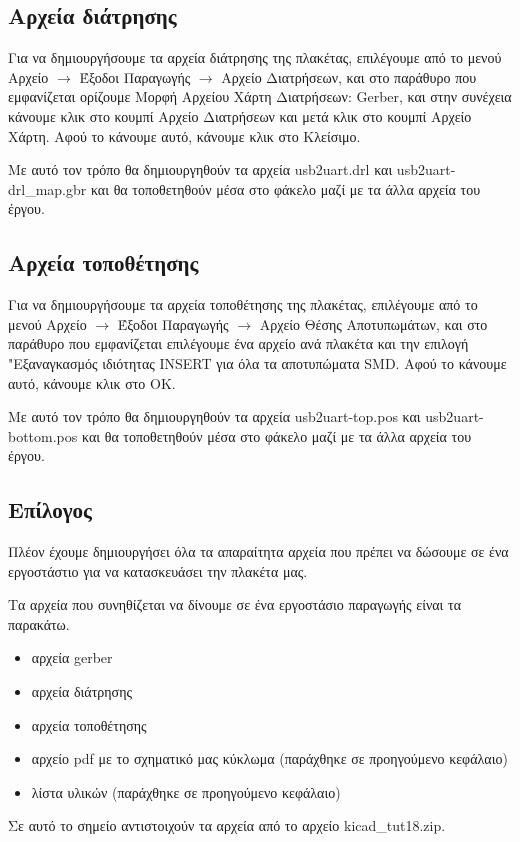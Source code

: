 \documentclass[a4paper]{article}
\begin{document}
\subsection{Αρχεία διάτρησης}
Για να δημιουργήσουμε τα αρχεία διάτρησης της πλακέτας, επιλέγουμε από το μενού Αρχείο $\rightarrow$ Έξοδοι Παραγωγής $\rightarrow$ Αρχείο Διατρήσεων, και στο παράθυρο που εμφανίζεται ορίζουμε Μορφή Αρχείου Χάρτη Διατρήσεων: Gerber, και στην συνέχεια κάνουμε κλικ στο κουμπί Αρχείο Διατρήσεων και μετά κλικ στο κουμπί Αρχείο Χάρτη. Αφού το κάνουμε αυτό, κάνουμε κλικ στο Κλείσιμο.

\begin{figure}
  \begin{center}
    \label{fig:kicad-main}
  \end{center}
\end{figure}

Με αυτό τον τρόπο θα δημιουργηθούν τα αρχεία usb2uart.drl και usb2uart-drl\_map.gbr και θα τοποθετηθούν μέσα στο φάκελο μαζί με τα άλλα αρχεία του έργου.

\subsection{Αρχεία τοποθέτησης}
Για να δημιουργήσουμε τα αρχεία τοποθέτησης της πλακέτας, επιλέγουμε από το μενού Αρχείο $\rightarrow$ Έξοδοι Παραγωγής $\rightarrow$ Αρχείο Θέσης Αποτυπωμάτων, και στο παράθυρο που εμφανίζεται επιλέγουμε ένα αρχείο ανά πλακέτα και την επιλογή "Εξαναγκασμός ιδιότητας INSERT για όλα τα αποτυπώματα SMD. Αφού το κάνουμε αυτό, κάνουμε κλικ στο OK.

Με αυτό τον τρόπο θα δημιουργηθούν τα αρχεία usb2uart-top.pos και usb2uart-bottom.pos και θα τοποθετηθούν μέσα στο φάκελο μαζί με τα άλλα αρχεία του έργου.

\subsection{Επίλογος}
Πλέον έχουμε δημιουργήσει όλα τα απαραίτητα αρχεία που πρέπει να δώσουμε σε ένα εργοστάστιο για να κατασκευάσει την πλακέτα μας.

Τα αρχεία που συνηθίζεται να δίνουμε σε ένα εργοστάσιο παραγωγής είναι τα παρακάτω.

\begin{itemize}
    \item αρχεία gerber
    \item αρχεία διάτρησης
    \item αρχεία τοποθέτησης
    \item αρχείο pdf με το σχηματικό μας κύκλωμα (παράχθηκε σε προηγούμενο κεφάλαιο)
    \item λίστα υλικών (παράχθηκε σε προηγούμενο κεφάλαιο)
\end{itemize}

Σε αυτό το σημείο αντιστοιχούν τα αρχεία από το αρχείο kicad\_tut18.zip.

  
\end{document}

